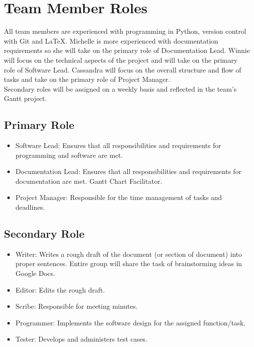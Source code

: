 \documentclass{article}
\begin{document}
\section{Team Member Roles}
\hspace{5mm}All team members are experienced with programming in Python, version control with Git and LaTeX. Michelle is more experienced with documentation requirements so she will take on the primary role of Documentation Lead. Winnie will focus on the technical aspects of the project and will take on the primary role of Software Lead. Cassandra will focus on the overall structure and flow of tasks and take on the primary role of Project Manager.\\

Secondary roles will be assigned on a weekly basis and reflected in the team's Gantt project.

\subsection{Primary Role}
\begin{itemize}
\item Software Lead: Ensures that all responsibilities and requirements for programming and software are met. 
\item Documentation Lead: Ensures that all responsibilities and requirements for documentation are met. Gantt Chart Facilitator.
\item Project Manager: Responsible for the time management of tasks and deadlines.
\end{itemize}

\subsection{Secondary Role}
\begin{itemize}
\item Writer: Writes a rough draft of the document (or section of document) into proper sentences. Entire group will share the task of brainstorming ideas in Google Docs.
\item Editor: Edits the rough draft.
\item Scribe: Responsible for meeting minutes. 
\item Programmer: Implements the software design for the assigned function/task.
\item Tester: Develops and administers test cases.
\end{itemize}
\end{document}

